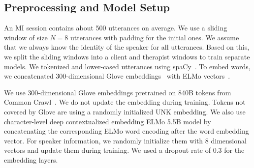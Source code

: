 
\subsection{Preprocessing and Model Setup}
\label{ssec:snt:exp_setup}


An MI session contains about 500 utterances on average. We use a
sliding window of size $N=8$ utterances with padding for the initial
ones. We assume that we always know the identity of the speaker for
all utterances. Based on this, we split the sliding windows into a
client and therapist windows to train separate models.
%
We tokenized and lower-cased utterances using
spaCy~\citep{spacy2}. To embed words, we concatenated 300-dimensional
Glove embeddings~\citep{pennington2014glove} with ELMo
vectors~\citep{Peters:2018}.

We use 300-dimensional Glove embeddings pretrained on 840B tokens
from Common Crawl~\citep{pennington2014glove}. We do not update the
embedding during training. Tokens not covered by Glove are using a
randomly initialized UNK embedding. We also use character-level deep
contextualized embedding ELMo 5.5B model by concatenating the
corresponding ELMo word encoding after the word embedding vector. For
speaker information, we randomly initialize them with 8 dimensional
vectors and update them during training. We used a dropout rate of 0.3
for the embedding layers.

